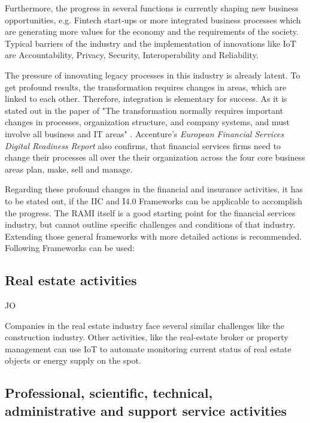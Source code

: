 Furthermore, the progress in several functions is currently shaping new business opportunities, e.g. Fintech start-ups or more integrated business processes which are generating more values for the economy and the requirements of the society.
Typical barriers of the industry and the implementation of innovations like \ac{IoT} are Accountability, Privacy, Security, Interoperability and Reliability. \cite{WEF-futureFinancialServices, Weber2011133, CapGemini-IoT-financialServices} %

The pressure of innovating legacy processes in this industry is already latent. To get profound results, the transformation requires changes in areas, which are linked to each other. Therefore, integration is elementary for success. As it is stated out in the paper of \citeauthor{ArthurDLittle-FinancialService} "The transformation normally requires important changes in processes, organization structure, and company systems, and must involve all business and IT areas" \cite[p.4 ]{ArthurDLittle-FinancialService}. Accenture's \emph{European Financial Services Digital Readiness Report} also confirms, that financial services firms need to change their processes all over the their organization across the four core business areas plan, make, sell and manage. \cite[p. 9]{accenture-europeanFinancialServices-digitalReadinessReport}

Regarding these profound changes in the financial and insurance activities, it has to be stated out, if the IIC and I4.0 Frameworks can be applicable to accomplish the progress. The \ac{RAMI} itself is a good starting point for the financial services industry, but cannot outline specific challenges and conditions of that industry. Extending those general frameworks with more detailed actions is recommended. Following Frameworks can be used:


\subsection{Real estate activities}
JO

Companies in the real estate industry face several similar challenges like the construction industry. Other activities, like the real-estate broker or property management can use \ac{IoT} to automate monitoring current status of real estate objects or energy supply on the spot.

\subsection{Professional, scientific, technical, administrative and support service activities}

